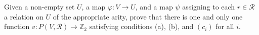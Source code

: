 Given a non-empty set $U$, a map $\varphi : V \to U$, and a map $\psi$ assigning to each $r \in \mathcal{R}$ a relation on $U$ of the appropriate arity, prove that there is one and only one function $v : P(V, \mathcal{R}) \to \mathbb{Z}_2$ satisfying conditions (a), (b), and $(c_i)$ for all $i$.
